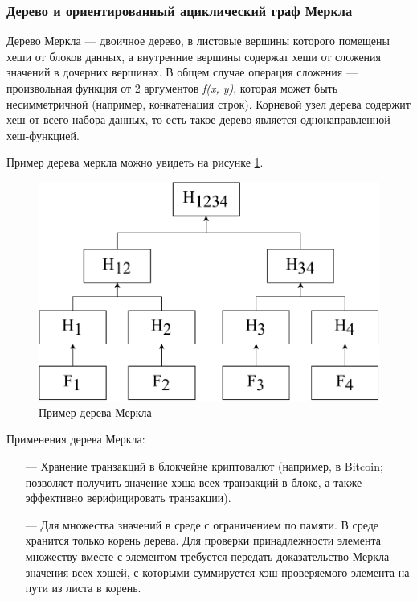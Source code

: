 \subsubsection{Дерево и ориентированный ациклический граф Меркла}

Дерево Меркла\cite{merkle} --- двоичное дерево, в листовые вершины которого помещены хеши от блоков данных, а внутренние вершины содержат хеши от сложения значений в дочерних вершинах. В общем случае операция сложения --- произвольная функция от 2 аргументов \textit{f(x, y)}, которая может быть несимметричной (например, конкатенация строк). Корневой узел дерева содержит хеш от всего набора данных, то есть такое дерево является однонаправленной хеш-функцией.

Пример дерева меркла можно увидеть на рисунке \ref{fig:mtree}.

\begin{figure}[hbtp]
    \centering
    \includegraphics[width=\textwidth]{img/merkletree.pdf}
    \caption{Пример дерева Меркла}
    \label{fig:mtree}
\end{figure}

Применения дерева Меркла:
\begin{itemize}
    \item[---] Хранение транзакций в блокчейне криптовалют (например, в Bitcoin; позволяет получить значение хэша всех транзакций в блоке, а также эффективно верифицировать транзакции).
    \item[---] Для множества значений в среде с ограничением по памяти. В среде хранится только корень дерева. Для проверки принадлежности элемента множеству вместе с элементом требуется передать доказательство Меркла --- значения всех хэшей, с которыми суммируется хэш проверяемого элемента на пути из листа в корень.
\end{itemize}

